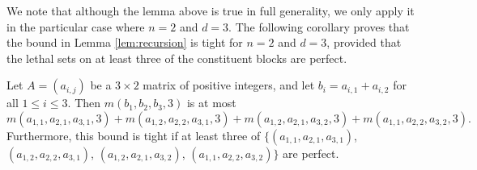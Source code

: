 We note that although the lemma above is true in full generality, we only apply it in the particular case where $n=2$ and $d=3$. The following corollary proves that the bound in Lemma \ref{lem:recursion} is tight for $n=2$ and $d=3$, provided that the lethal sets on at least three of the constituent blocks are perfect. 

\begin{cor}
\label{cor:recursion}
Let $A=(a_{i,j})$ be a $3 \times 2$ matrix of positive integers, and let $b_i = a_{i,1} + a_{i,2}$ for all $1 \leq i \leq 3$. Then $m(b_1, b_2, b_3, 3)$ is at most
$$m(a_{1,1}, a_{2,1}, a_{3,1}, 3) +  m(a_{1,2}, a_{2,2}, a_{3,1}, 3) + m(a_{1,2}, a_{2,1}, a_{3,2}, 3) + m(a_{1,1}, a_{2,2}, a_{3,2}, 3).$$
Furthermore, this bound is tight if at least three of $\{(a_{1,1}, a_{2,1}, a_{3,1})$, $(a_{1,2}, a_{2,2}, a_{3,1})$, $(a_{1,2}, a_{2,1}, a_{3,2})$, $(a_{1,1}, a_{2,2}, a_{3,2})\}$ are perfect. 
\end{cor}

